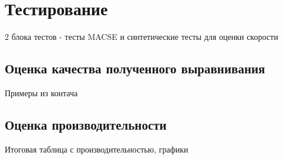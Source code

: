 \newpage

\section[Тестирование]{\large \centering Тестирование}
\hspace{\parindent} 2 блока тестов - тесты MACSE и синтетические тесты для оценки скорости

\subsection[Оценка качества полученного выравнивания]{\large Оценка качества полученного выравнивания}
\hspace{\parindent} Примеры из контача

\subsection[Оценка производительности]{\large Оценка производительности}
\hspace{\parindent} Итоговая таблица с производительностью, графики

